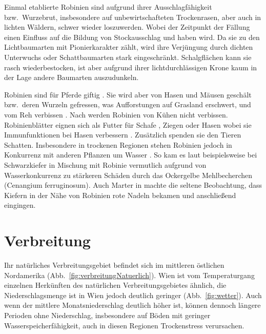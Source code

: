 \documentclass[twocolumn]{scrartcl}
\begin{document}
Einmal etablierte Robinien sind aufgrund ihrer Ausschlagfähigkeit
bzw.\ Wurzebrut, insbesondere auf unbewirtschafteten Trockenrasen, aber
auch in lichten Wäldern, schwer wieder loszuwerden. Wobei der Zeitpunkt
der Fällung einen Einfluss auf die Bildung von Stockausschlag und
haben wird. Da sie zu den
Lichtbaumarten mit Pionierkarakter zählt, wird ihre Verjüngung durch
dichten Unterwuchs oder Schattbaumarten stark
eingeschränkt. Schalgflächen kann sie rasch wiederbestocken, ist aber
aufgrund ihrer lichtdurchlässigen Krone kaum in der Lage andere
Baumarten auszudunkeln.

Robinien sind für Pferde giftig \citep{grosche2008robiniePferd}. Sie
wird aber von Hasen und Mäusen geschält bzw.\ deren Wurzeln gefressen,
was Aufforstungen auf Grasland erschwert, und vom Reh verbissen
\citep{barta2023robinieReh}. Nach \citet{berner2018robinie} werden
Robinien von Kühen nicht verbissen. Robinienblätter eignen sich als
Futter für Schafe \citep{ganai2009robnieSchaf}, Ziegen
\citep{papachristou1999robinieZiege} oder Hasen
\citep{singh2010robnieHasennahrung} wobei sie Immunfunktionen bei
Hasen verbessern \citep{yang2017robinieHasen}. Zusätzlich spenden sie
den Tieren Schatten. Insbesondere in trockenen Regionen stehen
Robinien jedoch in Konkurrenz mit anderen Pflanzen um Wasser
\citep{halasz2021robinieAlsTierutter}. So kam es laut
\citet[S.~96]{donaubauer1974kiefernsterben} beispielsweise bei
Schwarzkiefer in Mischung mit Robinie vermutlich aufgrund von
Wasserkonkurrenz zu stärkeren Schäden durch das Ockergelbe
Mehlbecherchen (Cenangium ferruginosum).  Auch Marter in
\citet[S.~93]{erteld1952robinieErtrag} machte die seltene Beobachtung,
dass Kiefern in der Nähe von Robinien rote Nadeln bekamen und
anschließend eingingen.

\section{Verbreitung}

Ihr natürliches Verbreitungsgebiet
befindet sich im mittleren östlichen Nordamerika
(Abb.~\ref{fig:verbreitungNatuerlich}). Wien ist vom Temperaturgang einzelnen
Herkünften des natürlichen Verbreitungsgebietes ähnlich, die Niederschlagsmenge
ist in Wien jedoch deutlich geringer (Abb.~\ref{fig:wetter}). Auch wenn der
mittlere Monatsniederschlag deutlich höher ist, können dennoch längere Perioden
ohne Niederschlag, insbesondere auf Böden mit geringer Wasserspeicherfähigkeit,
auch in diesen Regionen Trockenstress verursachen.
\end{document}
